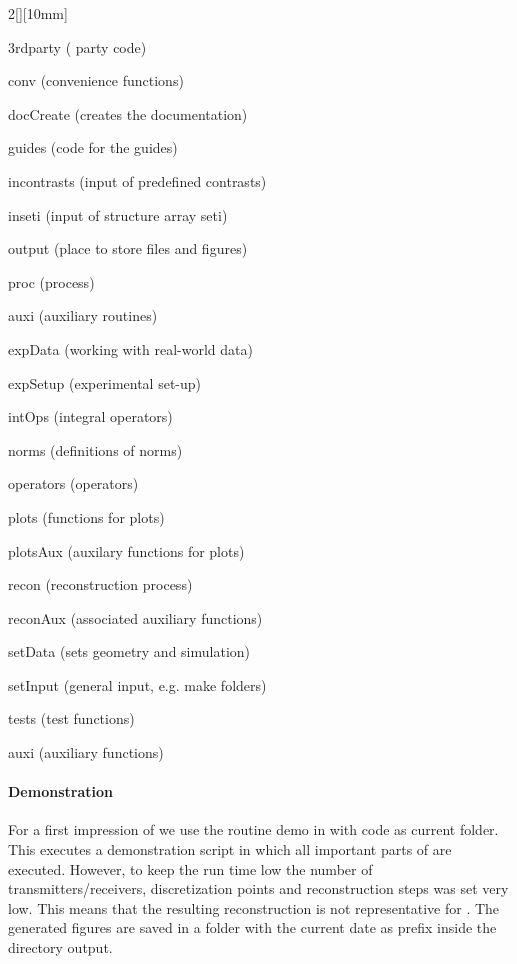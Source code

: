 \documentclass[a4paper]{article}
\begin{document}
\setlength{\columnseprule}{0.25pt}
\setlength{\columnsep}{10pt}
\begin{multicols}{2}[][10mm]
\begin{compactitem}
  \item \textsf{3rdparty} ( party code)
  \item \textsf{conv} (convenience functions)
  \item \textsf{docCreate} (creates the documentation)
  \item \textsf{guides} (code for the guides)
  \item \textsf{incontrasts} (input of predefined contrasts)
  \item \textsf{inseti} (input of structure array \textsf{seti})
  \item \textsf{output} (place to store files and figures)
  \item \textsf{proc} (process)
  \begin{compactitem}
   \item \textsf{auxi} (auxiliary routines)
   \item \textsf{expData} (working with real-world data)
   \item \textsf{expSetup} (experimental set-up)
   \item \textsf{intOps} (integral operators)
   \item \textsf{norms} (definitions of norms)
   \item \textsf{operators} (operators)
   \item \textsf{plots} (functions for plots)
   \item \textsf{plotsAux} (auxilary functions for plots)
   \item \textsf{recon} (reconstruction process)
   \item \textsf{reconAux} (associated auxiliary functions)
   \item \textsf{setData} (sets geometry and simulation)
   \item \textsf{setInput} (general input, e.g. make folders)
  \end{compactitem}
  \item \textsf{tests} (test functions)
  \begin{compactitem}
   \item \textsf{auxi} (auxiliary functions)
  \end{compactitem}
\end{compactitem}
\end{multicols}

\paragraph{Demonstration} For a first impression of \IPscatt we use the routine \textsf{demo} in \MATLAB with \textsf{code} as current folder. This executes a demonstration script in which all important parts of \IPscatt are executed. However, to keep the run time low the number of transmitters/receivers, discretization points and reconstruction steps was set very low. This means that the resulting reconstruction is not representative for \IPscatt. The generated figures are saved in a folder with the current date as prefix inside the directory \textsf{output}.
\end{document}
